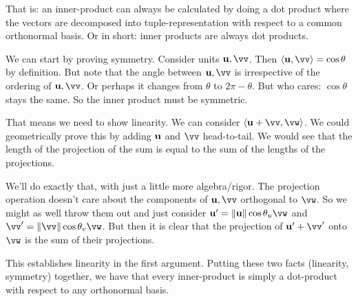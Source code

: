 \noindent
That is: an inner-product can always be calculated by doing a dot
product where the vectors are decomposed into tuple-representation with
respect to a common orthonormal basis. Or in short: inner products are
always dot products.

We can start by proving symmetry. Consider units $\vu, \vv$. Then
$\innerprod{\vu}{\vv} = \cos\theta$ by definition. But note that the
angle between $\vu, \vv$ is irrespective of the ordering of $\vu, \vv$.
Or perhaps it changes from $\theta$ to $2\pi - \theta$. But who cares:
$\cos\theta$ stays the same. So the inner product must be symmetric.

That means we need to show linearity. We can consider $\innerprod{\vu +
\vv}{\vw}$. We could geometrically prove this by adding $\bm{\mathrm{u}}$ and $\vv$
head-to-tail. We would see that the length of the projection of the sum
is equal to the sum of the lengths of the projections.

We'll do exactly that, with just a little more algebra/rigor. The
projection operation doesn't care about the components of $\vu, \vv$
orthogonal to $\vw$. So we might as well throw them out and just
consider $\vu' = \norm{\vu} \cos\theta_u \vw$ and $\vv' = \norm{\vv}
\cos\theta_v \vw$. But then it is clear that the projection of $\vu' +
\vv'$ onto $\vw$ is the sum of their projections.

This establishes linearity in the first argument. Putting these two
facts (linearity, symmetry) together, we have that every inner-product
is simply a dot-product with respect to any orthonormal basis.
